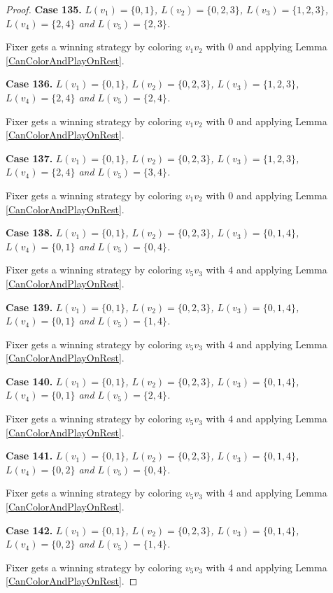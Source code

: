 \documentclass[12pt]{amsart}
\theoremstyle{plain}
\theoremstyle{definition}
\theoremstyle{remark}
\begin{document}
\begin{proof}
\noindent\textbf{Case 135.  }\textit{$L(v_1) = \{0, 1\}$, $L(v_2) = \{0, 2, 3\}$, $L(v_3) = \{1, 2, 3\}$, $L(v_4) = \{2, 4\}$ and $L(v_5) = \{2, 3\}$.}

Fixer gets a winning strategy by coloring $v_1v_2$ with $0$ and applying Lemma \ref{CanColorAndPlayOnRest}.

\noindent\textbf{Case 136.  }\textit{$L(v_1) = \{0, 1\}$, $L(v_2) = \{0, 2, 3\}$, $L(v_3) = \{1, 2, 3\}$, $L(v_4) = \{2, 4\}$ and $L(v_5) = \{2, 4\}$.}

Fixer gets a winning strategy by coloring $v_1v_2$ with $0$ and applying Lemma \ref{CanColorAndPlayOnRest}.

\noindent\textbf{Case 137.  }\textit{$L(v_1) = \{0, 1\}$, $L(v_2) = \{0, 2, 3\}$, $L(v_3) = \{1, 2, 3\}$, $L(v_4) = \{2, 4\}$ and $L(v_5) = \{3, 4\}$.}

Fixer gets a winning strategy by coloring $v_1v_2$ with $0$ and applying Lemma \ref{CanColorAndPlayOnRest}.

\noindent\textbf{Case 138.  }\textit{$L(v_1) = \{0, 1\}$, $L(v_2) = \{0, 2, 3\}$, $L(v_3) = \{0, 1, 4\}$, $L(v_4) = \{0, 1\}$ and $L(v_5) = \{0, 4\}$.}

Fixer gets a winning strategy by coloring $v_5v_3$ with $4$ and applying Lemma \ref{CanColorAndPlayOnRest}.

\noindent\textbf{Case 139.  }\textit{$L(v_1) = \{0, 1\}$, $L(v_2) = \{0, 2, 3\}$, $L(v_3) = \{0, 1, 4\}$, $L(v_4) = \{0, 1\}$ and $L(v_5) = \{1, 4\}$.}

Fixer gets a winning strategy by coloring $v_5v_3$ with $4$ and applying Lemma \ref{CanColorAndPlayOnRest}.

\noindent\textbf{Case 140.  }\textit{$L(v_1) = \{0, 1\}$, $L(v_2) = \{0, 2, 3\}$, $L(v_3) = \{0, 1, 4\}$, $L(v_4) = \{0, 1\}$ and $L(v_5) = \{2, 4\}$.}

Fixer gets a winning strategy by coloring $v_5v_3$ with $4$ and applying Lemma \ref{CanColorAndPlayOnRest}.

\noindent\textbf{Case 141.  }\textit{$L(v_1) = \{0, 1\}$, $L(v_2) = \{0, 2, 3\}$, $L(v_3) = \{0, 1, 4\}$, $L(v_4) = \{0, 2\}$ and $L(v_5) = \{0, 4\}$.}

Fixer gets a winning strategy by coloring $v_5v_3$ with $4$ and applying Lemma \ref{CanColorAndPlayOnRest}.

\noindent\textbf{Case 142.  }\textit{$L(v_1) = \{0, 1\}$, $L(v_2) = \{0, 2, 3\}$, $L(v_3) = \{0, 1, 4\}$, $L(v_4) = \{0, 2\}$ and $L(v_5) = \{1, 4\}$.}

Fixer gets a winning strategy by coloring $v_5v_3$ with $4$ and applying Lemma \ref{CanColorAndPlayOnRest}.


\end{proof}
\end{document}
